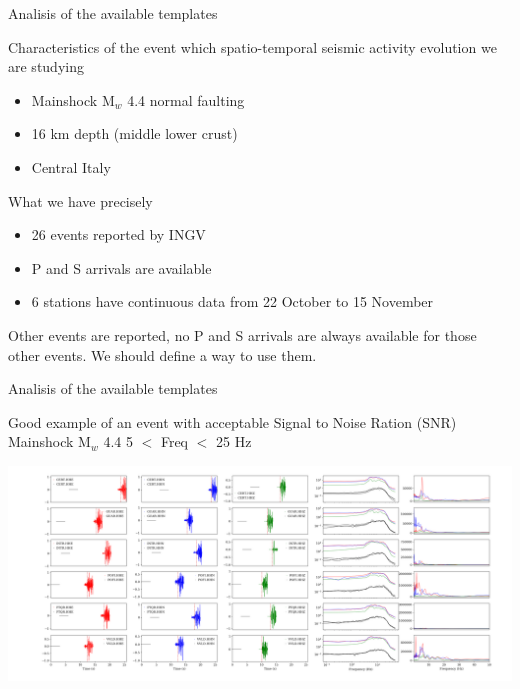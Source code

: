 \documentclass[aspectratio=43,9pt]{beamer}
\begin{document}
\begin{frame}{Analisis of the available templates}
 
   \begin{minipage}{1\linewidth}

   Characteristics of the event which 
   spatio-temporal seismic activity evolution 
   we are studying
    \begin{itemize}
     \item Mainshock M$_w$ 4.4 normal faulting
     \item 16 km depth (middle lower crust)
     \item Central Italy     
    \end{itemize}

    \vskip 1cm
   
   What we have precisely
    \begin{itemize}
     \item 26 events reported by INGV
     \item P and S arrivals are available
     \item 6 stations have continuous data from 22 October to 15 November
    \end{itemize}   
  \end{minipage}
  \vskip 1cm
  Other events are reported, no P and S arrivals 
  are always available for those other events.
  We should define a way to use them.
  
\end{frame}


\begin{frame}{Analisis of the available templates}
 
   \begin{minipage}{1\linewidth}
    \centering Good example of an event with acceptable Signal to Noise Ration (SNR) 
    \vskip 0.4cm 
    \centering Mainshock M$_w$ 4.4  5 $<$ Freq  $<$ 25 Hz 
    \begin{center}
     \includegraphics[width=1\linewidth]{figs/mw_4p4_snr.png}     
    \end{center}
  \end{minipage}
   
\end{frame}
\end{document}
